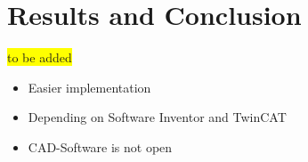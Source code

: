 \section{Results and Conclusion}
\colorbox{yellow}{to be added}
\begin{itemize}
	\item Easier implementation 
	\item Depending on Software Inventor and TwinCAT
	\item CAD-Software is not open
\end{itemize}